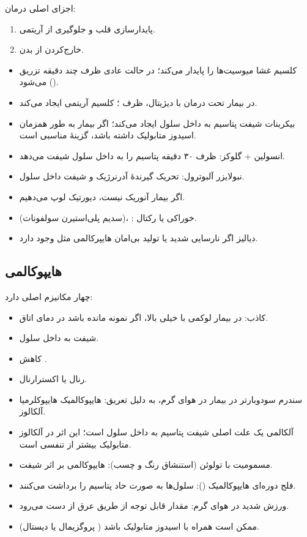 \documentclass[11pt,a4paper]{article}
\begin{document}
اجزای اصلی درمان:
\begin{enumerate}
\item پایدارسازی قلب و جلوگیری از آریتمی.
\item خارج‌کردن  از بدن.
\end{enumerate}
\begin{itemize}
\item کلسیم غشا میوسیت‌ها را پایدار می‌کند؛ در حالت عادی ظرف چند دقیقه تزریق می‌شود ().
\item در بیمار تحت درمان با دیژیتال، ظرف ؛ کلسیم آریتمی ایجاد می‌کند.
\item بیکربنات شیفت پتاسیم به داخل سلول ایجاد می‌کند؛ اگر بیمار به طور همزمان اسیدوز متابولیک داشته باشد، گزینهٔ مناسبی است.
\item انسولین + گلوکز: ظرف ۳۰ دقیقه پتاسیم را به داخل سلول شیفت می‌دهد.
\item نبولایزر آلبوترول: تحریک گیرندهٔ  آدرنرژیک و شیفت داخل سلول. %
\item اگر بیمار آنوریک نیست، دیورتیک لوپ می‌دهیم.
\item {} (سدیم پلی‌استیرن سولفونات)، : خوراکی یا رکتال.
\item دیالیز اگر نارسایی شدید یا تولید بی‌امان هایپرکالمی مثل  وجود دارد.
\end{itemize}
\subsection*{هایپوکالمی}
چهار مکانیزم اصلی دارد:
\begin{itemize}
\item کاذب: در بیمار لوکمی با  خیلی بالا، اگر نمونه مانده باشد در دمای اتاق.
\item شیفت به داخل سلول.
\item کاهش .
\item {} رنال یا اکسترارنال.
\end{itemize}

\begin{itemize}
\item سندرم سودوبارتر در بیمار  در هوای گرم، به دلیل تعریق: هایپوکالمیک هایپوکلرمیا آلکالوز.
\item آلکالمی یک علت اصلی شیفت پتاسیم به داخل سلول است؛ این اثر در آلکالوز متابولیک بیشتر از تنفسی است.
\item مسمومیت با تولوئن (استنشاق رنگ و چسب): هایپوکالمی بر اثر شیفت.
\item فلج دوره‌ای هایپوکالمیک (): سلول‌ها به صورت حاد پتاسیم را برداشت می‌کنند.
\item ورزش شدید در هوای گرم: مقدار قابل توجه  از طریق عرق از دست می‌رود.
\item {} ممکن است همراه با اسیدوز متابولیک باشد ( پروگزیمال یا دیستال).
\end{itemize}
\end{document}
